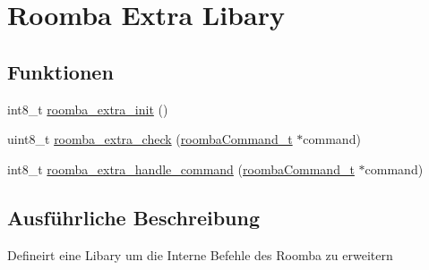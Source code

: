 \hypertarget{group__roomba__extra}{\section{Roomba Extra Libary}
\label{group__roomba__extra}
}
\subsection*{Funktionen}
\begin{DoxyCompactItemize}
\item 
int8\-\_\-t \hyperlink{group__roomba__extra_ga628536b5be09953da707128ad5b65644}{roomba\-\_\-extra\-\_\-init} ()
\item 
uint8\-\_\-t \hyperlink{group__roomba__extra_ga1f8c1042a260d62e25bec5311dd7e2e0}{roomba\-\_\-extra\-\_\-check} (\hyperlink{group__roomba__def_gae2455d95f239542954d232e31bb04a0e}{roomba\-Command\-\_\-t} $\ast$command)
\item 
int8\-\_\-t \hyperlink{group__roomba__extra_gabd4a3547abc24a615cb7d5b87aaf9252}{roomba\-\_\-extra\-\_\-handle\-\_\-command} (\hyperlink{group__roomba__def_gae2455d95f239542954d232e31bb04a0e}{roomba\-Command\-\_\-t} $\ast$command)
\end{DoxyCompactItemize}


\subsection{Ausführliche Beschreibung}
Defineirt eine Libary um die Interne Befehle des Roomba zu erweitern 


